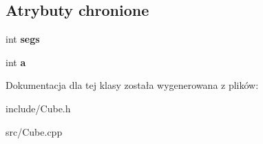 \subsection*{Atrybuty chronione}
\begin{DoxyCompactItemize}
\item 
\hypertarget{class_swift_1_1_cube_ada2febc703f56b7cb623e114656a9fc0}{int {\bfseries segs}}\label{class_swift_1_1_cube_ada2febc703f56b7cb623e114656a9fc0}

\item 
\hypertarget{class_swift_1_1_cube_a7e8e1e2d724967ce411274db7052134f}{int {\bfseries a}}\label{class_swift_1_1_cube_a7e8e1e2d724967ce411274db7052134f}

\end{DoxyCompactItemize}


Dokumentacja dla tej klasy została wygenerowana z plików\-:\begin{DoxyCompactItemize}
\item 
include/Cube.\-h\item 
src/Cube.\-cpp\end{DoxyCompactItemize}
